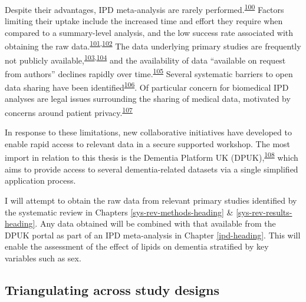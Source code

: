 \documentclass[a4paper, twoside]{templates/ociamthesis}
\begin{document}
Despite their advantages, IPD meta-analysis are rarely performed.\textsuperscript{\protect\hyperlink{ref-tugwell2010}{100}} Factors limiting their uptake include the increased time and effort they require when compared to a summary-level analysis, and the low success rate associated with obtaining the raw data.\textsuperscript{\protect\hyperlink{ref-nevitt2017}{101},\protect\hyperlink{ref-ventresca2020}{102}} The data underlying primary studies are frequently not publicly available,\textsuperscript{\protect\hyperlink{ref-alsheikh-ali2011}{103},\protect\hyperlink{ref-federer2018}{104}} and the availability of data ``available on request from authors'' declines rapidly over time.\textsuperscript{\protect\hyperlink{ref-vines2014}{105}} Several systematic barriers to open data sharing have been identified\textsuperscript{\protect\hyperlink{ref-vanpanhuis2014}{106}}. Of particular concern for biomedical IPD analyses are legal issues surrounding the sharing of medical data, motivated by concerns around patient privacy.\textsuperscript{\protect\hyperlink{ref-wartenberg2010}{107}}

In response to these limitations, new collaborative initiatives have developed to enable rapid access to relevant data in a secure supported workshop. The most import in relation to this thesis is the Dementia Platform UK (DPUK),\textsuperscript{\protect\hyperlink{ref-bauermeister2020}{108}} which aims to provide access to several dementia-related datasets via a single simplified application process.

I will attempt to obtain the raw data from relevant primary studies identified by the systematic review in Chapters \ref{sys-rev-methods-heading} \& \ref{sys-rev-results-heading}. Any data obtained will be combined with that available from the DPUK portal as part of an IPD meta-analysis in Chapter \ref{ipd-heading}. This will enable the assessment of the effect of lipids on dementia stratified by key variables such as sex.

\hypertarget{intro-triangulation}{%
\subsection{Triangulating across study designs}\label{intro-triangulation}}
\end{document}
